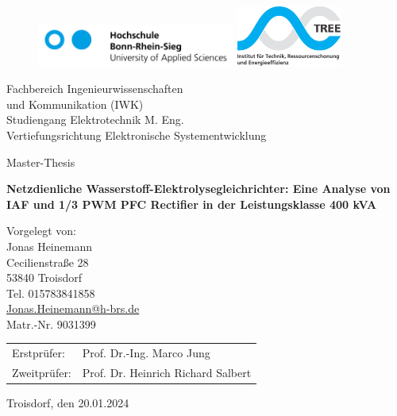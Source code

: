 \begin{titlepage}
	\setlength{\parindent}{0pt}%
	\begin{figure}
		\includegraphics[height=1.4cm]{content/Grafiken/H-BRS_Logo}
		\hfill
		\includegraphics[height=2cm]{content/Grafiken/BRS}
	\end{figure}
	\vspace{1cm}
	\begin{onehalfspace}
		 Fachbereich Ingenieurwissenschaften\\
		 und Kommunikation (IWK)\\
		Studiengang Elektrotechnik M. Eng.\\
		Vertiefungsrichtung Elektronische Systementwicklung 
		\vspace{2cm}
		\begin{center}
			\begin{singlespacing}
				{\large\textsf{Master-Thesis}\par}
				\vspace{1mm}
				{\huge\textbf{\textsf{
					Netzdienliche Wasserstoff-Elektrolysegleichrichter: Eine Analyse von IAF und 1/3 PWM PFC Rectifier in der Leistungsklasse 400 kVA
				}}\par}
			\end{singlespacing}
		\end{center}
		\vfill
		Vorgelegt von:\\
		Jonas Heinemann\\
		Cecilienstraße 28\\
		53840 Troisdorf\\
		Tel. 015783841858\\
		\href{mailto:Jonas.Heinemann@h-brs.de}{Jonas.Heinemann@h-brs.de}\\
		Matr.-Nr. 9031399
		\begin{table}
			\begin{tabular}{@{}ll}
				Erstprüfer:  & Prof. Dr.-Ing. Marco Jung\\
				Zweitprüfer: & Prof. Dr. Heinrich Richard Salbert\\
			\end{tabular}
		\end{table}
	\end{onehalfspace}
	Troisdorf, den 20.01.2024
\end{titlepage}
